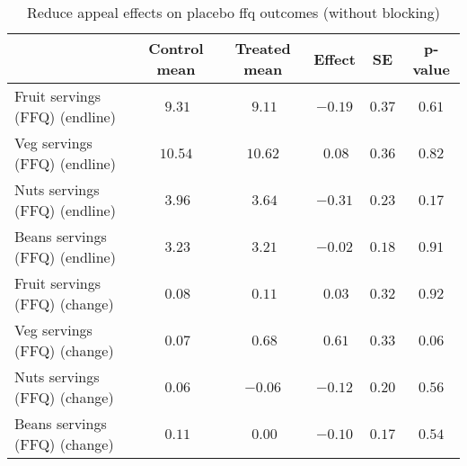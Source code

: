 \begin{table*}[ht]
\caption{Reduce appeal effects on placebo ffq outcomes (without blocking)\label{round}} 
\begin{center}
\begin{tabular}{lccccc}
\hline\hline
\multicolumn{1}{l}{}&\multicolumn{1}{c}{Control mean}&\multicolumn{1}{c}{Treated mean}&\multicolumn{1}{c}{Effect}&\multicolumn{1}{c}{SE}&\multicolumn{1}{c}{p-value}\tabularnewline
\hline
Fruit servings (FFQ) (endline)&$~9.31$&$~9.11$&$-0.19$&$0.37$&$0.61$\tabularnewline
Veg servings (FFQ) (endline)&$10.54$&$10.62$&$~0.08$&$0.36$&$0.82$\tabularnewline
Nuts servings (FFQ) (endline)&$~3.96$&$~3.64$&$-0.31$&$0.23$&$0.17$\tabularnewline
Beans servings (FFQ) (endline)&$~3.23$&$~3.21$&$-0.02$&$0.18$&$0.91$\tabularnewline
Fruit servings (FFQ) (change)&$~0.08$&$~0.11$&$~0.03$&$0.32$&$0.92$\tabularnewline
Veg servings (FFQ) (change)&$~0.07$&$~0.68$&$~0.61$&$0.33$&$0.06$\tabularnewline
Nuts servings (FFQ) (change)&$~0.06$&$-0.06$&$-0.12$&$0.20$&$0.56$\tabularnewline
Beans servings (FFQ) (change)&$~0.11$&$~0.00$&$-0.10$&$0.17$&$0.54$\tabularnewline
\hline
\end{tabular}\end{center}

\end{table*}
